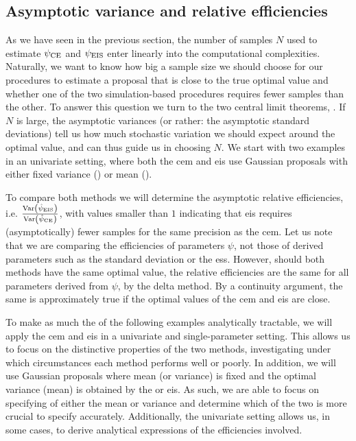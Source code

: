\subsection{Asymptotic variance and relative efficiencies}
As we have seen in the previous section, the number of samples $N$ used to estimate ${\psi_{\text{CE}}}$ and ${\psi_{\text{EIS}}}$ enter linearly into the computational complexities. Naturally, we want to know how big a sample size we should choose for our procedures to estimate a proposal that is close to the true optimal value and whether one of the two simulation-based procedures requires fewer samples than the other. To answer this question we turn to the two central limit theorems, . If $N$ is large, the asymptotic variances (or rather: the asymptotic standard deviations) tell us how much stochastic variation we should expect around the optimal value, and can thus guide us in choosing $N$. 
We start with two examples in an univariate setting, where both the \gls{cem} and \gls{eis} use Gaussian proposals with either fixed variance () or mean ().

To compare both methods we will determine the asymptotic relative efficiencies, i.e. $ \frac{\operatorname{Var} \left( {\hat\psi_{\text{EIS}}} \right)}{\operatorname{Var} \left( {\hat\psi_{\text{CE}}} \right)}$, with values smaller than $1$ indicating that \gls{eis} requires (asymptotically) fewer samples for the same precision as the \gls{cem}.
Let us note that we are comparing the efficiencies of parameters $\psi$, not those of derived parameters such as the standard deviation or the \gls{ess}. However, should both methods have the same optimal value, the relative efficiencies are the same for all parameters derived from $\psi$, by the delta method. By a continuity argument, the same is approximately true if the optimal values of the \gls{cem} and \gls{eis} are close.

To make as much the of the following examples analytically tractable, we will apply the \acrshort{cem} and \acrshort{eis} in a univariate and single-parameter setting. This allows us to focus on the distinctive properties of the two methods, investigating under which circumstances each method performs well or poorly. In addition, we will use Gaussian proposals where mean (or variance) is fixed and the optimal variance (mean) is obtained by the  or \acrshort{eis}.
As such, we are able to focus on specifying of either the mean or variance and determine which of the two is more crucial to specify accurately. Additionally, the univariate setting allows us, in some cases, to derive analytical expressions of the efficiencies involved.

